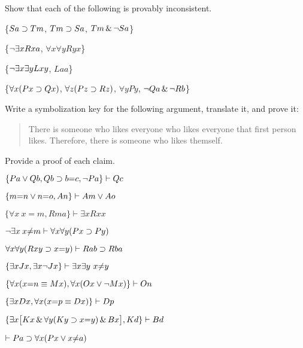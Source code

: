 \problempart
Show that each of the following is provably inconsistent.
\begin{earg}
\item \{$Sa\supset Tm$, $Tm \supset Sa$, $Tm \,\&\, \neg Sa$\}
\item \{$\neg\exists x Rxa$, $\forall x \forall y Ryx$\}
\item \{$\neg\exists x \exists y Lxy$, $Laa$\}
\item \{$\forall x(Px \supset Qx)$, $\forall z(Pz \supset Rz)$, $\forall y Py$, $\neg Qa \,\&\, \neg Rb$\}
\end{earg}



\solutions
\problempart
\label{pr.likes}
Write a symbolization key for the following argument, translate it, and prove it:
\begin{quote}
There is someone who likes everyone who likes everyone that first person likes. Therefore, there is someone who likes themself.
\end{quote}

\problempart
\label{pr.identity}
Provide a proof of each claim.
\begin{earg}
\item $\{Pa \vee Qb, Qb \supset b{=}c, \neg Pa\}\vdash Qc$
\item $\{m{=}n \vee n{=}o, An\}\vdash Am \vee Ao$
\item $\{\forall x \: x{=}m, Rma\}\vdash \exists x Rxx$
\item $\neg \exists x \: x {\neq} m \vdash \forall x\forall y (Px \supset Py)$
\item $\forall x\forall y(Rxy \supset x{=}y)\vdash Rab \supset Rba$
\item $\{\exists x Jx, \exists x \neg Jx\}\vdash \exists x \exists y\ x{\neq} y$
\item $\{\forall x(x{=}n \equiv Mx), \forall x(Ox \vee \neg Mx)\}\vdash On$
\item $\{\exists x Dx, \forall x(x{=}p \equiv Dx)\}\vdash Dp$
\item $\{\exists x\bigl[Kx \,\&\, \forall y(Ky \supset x{=}y) \,\&\, Bx\bigr], Kd\}\vdash Bd$
\item $\vdash Pa \supset \forall x(Px \vee x {\neq} a)$
\end{earg}



